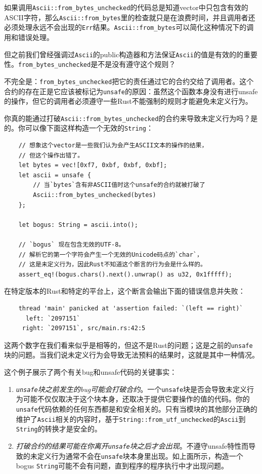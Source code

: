 如果调用\texttt{Ascii::from\_bytes\_unchecked}的代码总是知道vector中只包含有效的ASCII字符，那么\texttt{Ascii::from\_bytes}里的检查就只是在浪费时间，并且调用者还必须处理永远不会出现的\texttt{Err}结果。\texttt{Ascii::from\_bytes}可以简化这种情况下的调用和错误处理。

但之前我们曾经强调过\texttt{Ascii}的public构造器和方法保证\texttt{Ascii}的值是有效的的重要性。\texttt{from\_bytes\_unchecked}是不是没有遵守这个规则？

不完全是：\texttt{from\_bytes\_unchecked}把它的责任通过它的合约交给了调用者。这个合约的存在正是它应该被标记为\texttt{unsafe}的原因：虽然这个函数本身没有进行unsafe的操作，但它的调用者必须遵守一些Rust不能强制的规则才能避免未定义行为。

你真的能通过打破\texttt{Ascii::from\_bytes\_unchecked}的合约来导致未定义行为吗？是的。你可以像下面这样构造一个无效的\texttt{String}：
\begin{verbatim}
    // 想象这个vector是一些我们认为会产生ASCII文本的操作的结果，
    // 但这个操作出错了。
    let bytes = vec![0xf7, 0xbf, 0xbf, 0xbf];
    let ascii = unsafe {
        // 当`bytes`含有非ASCII值时这个unsafe的合约就被打破了
        Ascii::from_bytes_unchecked(bytes)
    };

    let bogus: String = ascii.into();

    // `bogus` 现在包含无效的UTF-8。
    // 解析它的第一个字符会产生一个无效的Unicode码点的`char`，
    // 这是未定义行为，因此Rust不知道这个断言的行为会是什么样的。
    assert_eq!(bogus.chars().next().unwrap() as u32, 0x1fffff);
\end{verbatim}

在特定版本的Rust和特定的平台上，这个断言会输出下面的错误信息并失败：
\begin{verbatim}
    thread 'main' panicked at 'assertion failed: `(left == right)`
      left: `2097151`
     right: `2097151`, src/main.rs:42:5
\end{verbatim}

这两个数字在我们看来似乎是相等的，但这不是Rust的问题；这是之前的\texttt{unsafe}块的问题。当我们说未定义行为会导致无法预料的结果时，这就是其中一种情况。

这个例子展示了两个有关bug和unsafe代码的关键事实：
\begin{enumerate}
    \item \emph{\texttt{unsafe}块之前发生的bug可能会打破合约}。一个\texttt{unsafe}块是否会导致未定义行为可能不仅仅取决于这个块本身，还取决于提供它要操作的值的代码。你的\texttt{unsafe}代码依赖的任何东西都是和安全相关的。只有当模块的其他部分正确的维护了\texttt{Ascii}相关的内容时，基于\texttt{String::from\_utf\_unchecked}的\texttt{Ascii}到\texttt{String}的转换才是安全的。
    \item \emph{打破合约的结果可能在你离开\texttt{unsafe}块之后才会出现}。不遵守unsafe特性而导致的未定义行为通常不会在\texttt{unsafe}块本身里出现。如上面所示，构造一个bogus \texttt{String}可能不会有问题，直到程序的程序执行中才出现问题。
\end{enumerate}

